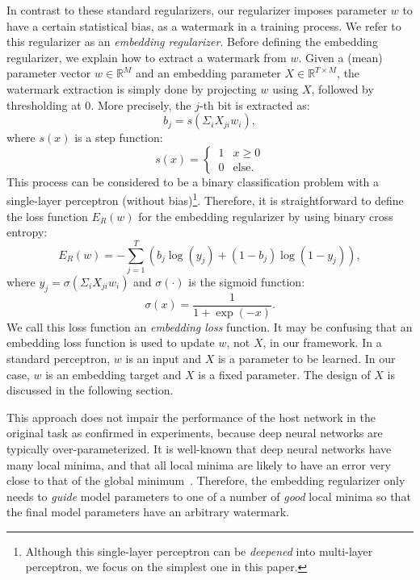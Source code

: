 \documentclass[10pt,twocolumn,letterpaper]{article}
\begin{document}
In contrast to these standard regularizers, our regularizer imposes parameter $w$ to have a certain statistical bias, as a watermark in a training process.
We refer to this regularizer as an \textit{embedding regularizer}.
Before defining the embedding regularizer, we explain how to extract a watermark from $w$.
Given a (mean) parameter vector $w \in \mathbb{R}^M$ and an embedding parameter $X \in \mathbb{R}^{T{\times}M}$, the watermark extraction is simply done by projecting $w$ using $X$, followed by thresholding at 0.
More precisely, the $j$-th bit is extracted as:
\begin{equation}
b_j = s(\Sigma_{i} X_{ji} w_i),
\end{equation}
where $s(x)$ is a step function:
\begin{equation}
	s(x) =
	\begin{cases}
		\, 1 & x \ge 0 \\
		\, 0 & \mathrm{else}.
	\end{cases}
\end{equation}
This process can be considered to be a binary classification problem with a single-layer perceptron (without bias)\footnote{Although this single-layer perceptron can be \textit{deepened} into multi-layer perceptron, we focus on the simplest one in this paper.}.
Therefore, it is straightforward to define the loss function $E_R (w)$ for the embedding regularizer by using binary cross entropy:
\begin{equation}
E_R (w) = - \sum_{j=1}^{T} \left( b_j \log(y_j) + (1 - b_j) \log(1 - y_j) \right),
\end{equation}
where $y_j = \sigma(\Sigma_{i} X_{ji} w_i)$ and $\sigma(\cdot)$ is the sigmoid function:
\begin{equation}
\sigma(x)=\frac{1}{1+\exp(-x)}.
\end{equation}
We call this loss function an \textit{embedding loss} function.
It may be confusing that an embedding loss function is used to update $w$, not $X$, in our framework.
In a standard perceptron, $w$ is an input and $X$ is a parameter to be learned.
In our case, $w$ is an embedding target and $X$ is a fixed parameter.
The design of $X$ is discussed in the following section.

This approach does not impair the performance of the host network in the original task as confirmed in experiments, because deep neural networks are typically over-parameterized.
It is well-known that deep neural networks have many local minima, and that all local minima are likely to have an error very close to that of the global minimum~\cite{dauphin_nips14, cho_aistats15}.
Therefore, the embedding regularizer only needs to \textit{guide} model parameters to one of a number of \textit{good} local minima so that the final model parameters have an arbitrary watermark.
\end{document}
